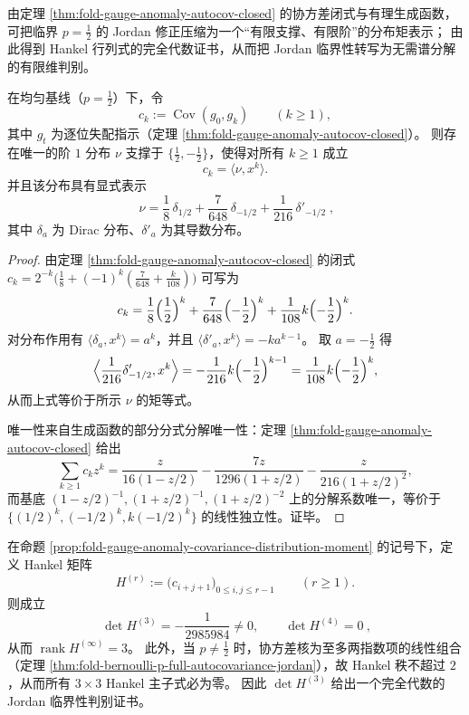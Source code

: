 由定理 \ref{thm:fold-gauge-anomaly-autocov-closed} 的协方差闭式与有理生成函数，可把临界 \(p=\tfrac12\) 的 Jordan 修正压缩为一个“有限支撑、有限阶”的分布矩表示；
由此得到 Hankel 行列式的完全代数证书，从而把 Jordan 临界性转写为无需谱分解的有限维判别。

\begin{proposition}[协方差核的分布矩表示]\label{prop:fold-gauge-anomaly-covariance-distribution-moment}
在均匀基线（\(p=\tfrac12\)）下，令
\[
c_k:=\operatorname{Cov}(g_0,g_k)\qquad(k\ge 1),
\]
其中 \(g_t\) 为逐位失配指示（定理 \ref{thm:fold-gauge-anomaly-autocov-closed}）。
则存在唯一的阶 \(1\) 分布 \(\nu\) 支撑于 \(\{\tfrac12,-\tfrac12\}\)，使得对所有 \(k\ge 1\) 成立
\[
c_k=\langle \nu, x^k\rangle.
\]
并且该分布具有显式表示
\[
\boxed{\;
\nu=\frac18\,\delta_{1/2}+\frac{7}{648}\,\delta_{-1/2}+\frac{1}{216}\,\delta'_{-1/2}\; } ,
\]
其中 \(\delta_a\) 为 Dirac 分布、\(\delta'_a\) 为其导数分布。
\end{proposition}

\begin{proof}
由定理 \ref{thm:fold-gauge-anomaly-autocov-closed} 的闭式
\(
c_k=2^{-k}\bigl(\tfrac18+(-1)^k(\tfrac{7}{648}+\tfrac{k}{108})\bigr)
\)
可写为
\[
c_k=\frac18\Bigl(\frac12\Bigr)^k+\frac{7}{648}\Bigl(-\frac12\Bigr)^k+\frac{1}{108}k\Bigl(-\frac12\Bigr)^k.
\]
对分布作用有 \(\langle\delta_a,x^k\rangle=a^k\)，并且
\(
\langle \delta'_a,x^k\rangle=-k a^{k-1}
\)。
取 \(a=-\tfrac12\) 得
\[
\Bigl\langle \frac{1}{216}\delta'_{-1/2},x^k\Bigr\rangle
=-\frac{1}{216}k\Bigl(-\frac12\Bigr)^{k-1}
=\frac{1}{108}k\Bigl(-\frac12\Bigr)^k,
\]
从而上式等价于所示 \(\nu\) 的矩等式。
\par
唯一性来自生成函数的部分分式分解唯一性：定理 \ref{thm:fold-gauge-anomaly-autocov-closed} 给出
\[
\sum_{k\ge 1}c_k z^k
=\frac{z}{16(1-z/2)}-\frac{7z}{1296(1+z/2)}-\frac{z}{216(1+z/2)^2},
\]
而基底 \((1-z/2)^{-1},(1+z/2)^{-1},(1+z/2)^{-2}\) 上的分解系数唯一，等价于
\(\bigl\{(1/2)^k,(-1/2)^k,k(-1/2)^k\bigr\}\) 的线性独立性。证毕。
\end{proof}

\begin{theorem}\label{thm:fold-gauge-anomaly-hankel-jordan-certificate}
在命题 \ref{prop:fold-gauge-anomaly-covariance-distribution-moment} 的记号下，定义 Hankel 矩阵
\[
H^{(r)}:=\bigl(c_{i+j+1}\bigr)_{0\le i,j\le r-1}\qquad(r\ge 1).
\]
则成立
\[
\boxed{\ \det H^{(3)}=-\frac{1}{2985984}\neq 0,\qquad \det H^{(4)}=0\ },
\]
从而 \(\operatorname{rank}H^{(\infty)}=3\)。
此外，当 \(p\neq\tfrac12\) 时，协方差核为至多两指数项的线性组合（定理 \ref{thm:fold-bernoulli-p-full-autocovariance-jordan}），故 Hankel 秩不超过 \(2\)，从而所有 \(3\times 3\) Hankel 主子式必为零。
因此 \(\det H^{(3)}\) 给出一个完全代数的 Jordan 临界性判别证书。
\end{theorem}

